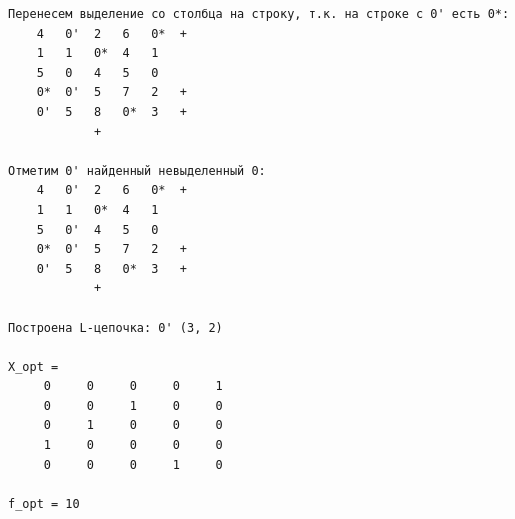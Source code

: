 \begin{center}
\begin{lstlisting}[label=lst:lab]
Перенесем выделение со столбца на строку, т.к. на строке с 0' есть 0*:
	4	0'	2	6	0*	+
	1	1	0*	4	1
	5	0	4	5	0
	0*	0'	5	7	2	+
	0'	5	8	0*	3	+
	 	 	+	 	 

Отметим 0' найденный невыделенный 0:
	4	0'	2	6	0*	+
	1	1	0*	4	1
	5	0'	4	5	0
	0*	0'	5	7	2	+
	0'	5	8	0*	3	+
	 	 	+	 	 

Построена L-цепочка: 0' (3, 2) 

X_opt = 
     0     0     0     0     1
     0     0     1     0     0
     0     1     0     0     0
     1     0     0     0     0
     0     0     0     1     0

f_opt = 10
\end{lstlisting}
\end{center}